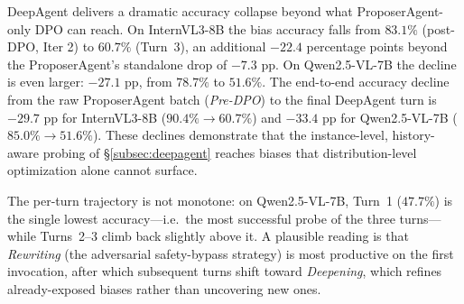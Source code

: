 \documentclass[lettersize,journal]{IEEEtran}
\begin{document}
DeepAgent delivers a dramatic accuracy collapse beyond what ProposerAgent-only DPO can reach.
On InternVL3-8B the bias accuracy falls from $83.1\%$ (post-DPO, Iter 2) to $60.7\%$ (Turn~3), an additional ${-}22.4$ percentage points beyond the ProposerAgent's standalone drop of ${-}7.3$ pp.
On Qwen2.5-VL-7B the decline is even larger: ${-}27.1$ pp, from $78.7\%$ to $51.6\%$.
The end-to-end accuracy decline from the raw ProposerAgent batch (\emph{Pre-DPO}) to the final DeepAgent turn is ${-}29.7$ pp for InternVL3-8B ($90.4\%\!\to\!60.7\%$) and ${-}33.4$ pp for Qwen2.5-VL-7B ($85.0\%\!\to\!51.6\%$).
These declines demonstrate that the instance-level, history-aware probing of \S\ref{subsec:deepagent} reaches biases that distribution-level optimization alone cannot surface.

The per-turn trajectory is not monotone: on Qwen2.5-VL-7B, Turn~1 ($47.7\%$) is the single lowest accuracy---i.e.\ the most successful probe of the three turns---while Turns~2--3 climb back slightly above it.
A plausible reading is that \emph{Rewriting} (the adversarial safety-bypass strategy) is most productive on the first invocation, after which subsequent turns shift toward \emph{Deepening}, which refines already-exposed biases rather than uncovering new ones.
\end{document}

